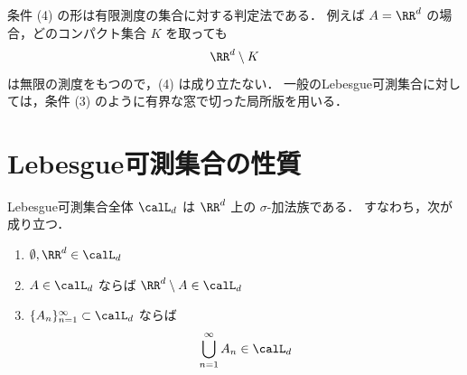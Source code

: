 \begin{remark}
条件 (4) の形は有限測度の集合に対する判定法である．
例えば $A=\RR^d$ の場合，どのコンパクト集合 $K$ を取っても
\[
\RR^d\setminus K
\]
は無限の測度をもつので，(4) は成り立たない．
一般のLebesgue可測集合に対しては，条件 (3) のように有界な窓で切った局所版を用いる．
\end{remark}


\section{Lebesgue可測集合の性質}

\begin{theorem}
\label{thm:lebesgue-measurable-sigma-algebra}
Lebesgue可測集合全体 $\calL_d$ は $\RR^d$ 上の $\sigma$-加法族である．
すなわち，次が成り立つ．
\begin{enumerate}
    \item $\emptyset,\RR^d\in\calL_d$
    \item $A\in\calL_d$ ならば $\RR^d\setminus A\in\calL_d$
    \item $\{A_n\}_{n=1}^{\infty}\subset\calL_d$ ならば
    \[
    \bigcup_{n=1}^{\infty}A_n\in\calL_d
    \]
\end{enumerate}
\end{theorem}
